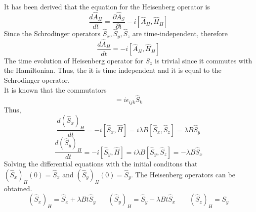 \begin{sol}
It has been derived that the equation for the Heisenberg operator is
\begin{equation}
	\frac{d\hat A_H}{dt}=\frac{\partial \hat A_S}{\partial t}-i[\hat A_H,\hat H_H]
\end{equation}
Since the Schrodinger operators $\hat S_x,\hat S_y,\hat S_z$ are time-independent, therefore
\begin{equation}
	\frac{d\hat A_H}{dt}=-i[\hat A_H,\hat H_H]
\end{equation}
The time evolution of Heisenberg operator for $S_z$ is trivial since it commutes with the Hamiltonian. Thus, the it is time independent and it is equal to the Schrodinger operator.\\
It is known that the commutators
\begin{equation}
	[\hat S_i,\hat S_j]=i\epsilon_{ijk}\hat S_k
\end{equation} 
Thus,
\begin{equation}
	\frac{d(\hat S_x)_H}{dt}=-i[\hat S_x,\hat H]=i\lambda B[\hat S_x,\hat S_z]=\lambda B\hat S_y
\end{equation}
\begin{equation}
	\frac{d(\hat S_y)_H}{dt}=-i[\hat S_y,\hat H]=i\lambda B[\hat S_y,\hat S_z]=-\lambda B\hat S_x
\end{equation}
Solving the differential equations with the initial conditons that $(\hat S_x)_H(0)=\hat S_x$ and $(\hat S_y)_H(0)=\hat S_y$. The Heisenberg operators can be obtained.
\begin{equation}
	(\hat S_x)_H=\hat S_x+\lambda Bt\hat S_y\:\:\:\:\:\:\:\:(\hat S_y)_H=\hat S_y-\lambda Bt\hat S_x\:\:\:\:\:\:\:\:\:(\hat S_z)_H=S_y
\end{equation} 

\end{sol}